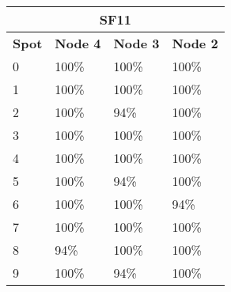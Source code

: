 \begin{tabular}{|l|l|l|l|}
\multicolumn{4}{c}{\textbf{SF11}} \\ \hline 
\textbf{Spot} & \textbf{Node 4} & \textbf{Node 3} & \textbf{Node 2} \\ \hline
0 & 100\% & 100\% & 100\% \\ \hline
1 & 100\% & 100\% & 100\% \\ \hline
2 & 100\% & 94\% & 100\% \\ \hline
3 & 100\% & 100\% & 100\% \\ \hline
4 & 100\% & 100\% & 100\% \\ \hline
5 & 100\% & 94\% & 100\% \\ \hline
6 & 100\% & 100\% & 94\% \\ \hline
7 & 100\% & 100\% & 100\% \\ \hline
8 & 94\% & 100\% & 100\% \\ \hline
9 & 100\% & 94\% & 100\% \\ \hline
\end{tabular}

